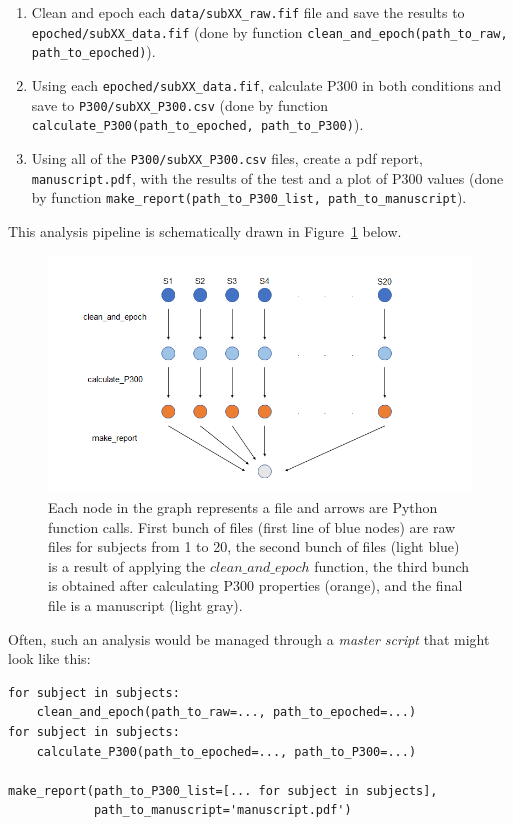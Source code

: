 \documentclass[a4paper,man,floatsintext,natbib]{apa6}
\begin{document}
\begin{enumerate}
    \item Clean and epoch each \verb|data/subXX_raw.fif| file and save the results to \verb|epoched/subXX_data.fif| (done by function \verb|clean_and_epoch(path_to_raw, path_to_epoched)|).
    \item Using each \verb|epoched/subXX_data.fif|, calculate P300 in both conditions and save to \verb|P300/subXX_P300.csv| (done by function \verb|calculate_P300(path_to_epoched, path_to_P300)|).
    \item Using all of the \verb|P300/subXX_P300.csv| files, create a pdf report, \verb|manuscript.pdf|, with the results of the test and a plot of P300 values (done by function \verb|make_report(path_to_P300_list, path_to_manuscript|).
\end{enumerate}

This analysis pipeline is schematically drawn in Figure~\ref{fig1} below.

\begin{figure}
\centering
\captionsetup{justification=centering}
\includegraphics[width=\textwidth]{pictures/Figure1_pipeline.png}
\caption{Each node in the graph represents a file and arrows are Python function calls. First bunch of files (first line of blue nodes) are raw files for subjects from 1 to 20, the second bunch of files (light blue) is a result of applying the $clean\_and\_epoch$ function, the third bunch is obtained after calculating P300 properties (orange), and the final file is a manuscript (light gray).} \label{fig1}
\end{figure}

Often, such an analysis would be managed through a \emph{master script} that might look like this:

\begin{verbatim}
for subject in subjects:
    clean_and_epoch(path_to_raw=..., path_to_epoched=...)
for subject in subjects:
    calculate_P300(path_to_epoched=..., path_to_P300=...)

make_report(path_to_P300_list=[... for subject in subjects],
            path_to_manuscript='manuscript.pdf')
\end{verbatim}
\end{document}
